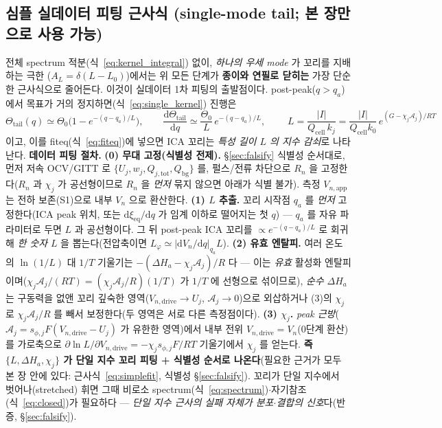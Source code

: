 \documentclass[11pt,a4paper]{article}
\newcommand{\dd}{\mathrm{d}}
\newcommand{\eq}{\mathrm{eq}}
\newcommand{\app}{\mathrm{app}}
\newcommand{\drive}{\mathrm{drive}}
\newcommand{\bg}{\mathrm{bg}}
\newcommand{\cell}{\mathrm{cell}}
\newcommand{\tot}{\mathrm{tot}}
\begin{document}
\subsection{심플 실데이터 피팅 근사식 (single-mode tail; 본 장만으로 사용 가능)}\label{sec:ch1_simplefit}
전체 spectrum 적분(식~\eqref{eq:kernel_integral}) 없이, \emph{하나의 우세 mode} 가 꼬리를 지배하는 극한
($A_L=\delta(L-L_0)$)에서는 위 모든 단계가 \textbf{종이와 연필로 닫히는} 가장 단순한 근사식으로 줄어든다. 이것이
실데이터 1차 피팅의 출발점이다. post-peak($q>q_a$) 에서 목표가 거의 정지하면(식~\eqref{eq:single_kernel}) 진행은
\begin{equation}
\Theta_\mathrm{tail}(q)\simeq\Theta_0\Big(1-e^{-(q-q_a)/L}\Big),\qquad
\frac{\dd\Theta_\mathrm{tail}}{\dd q}\simeq\frac{\Theta_0}{L}\,e^{-(q-q_a)/L},\qquad
\boxed{\;L=\frac{|I|}{Q_\cell\,k_j}=\frac{|I|}{Q_\cell k_0}\,e^{(G-\chi_j\mathcal A_j)/RT}\;}
\label{eq:simplefit}
\end{equation}
이고, 이를 fiteq(식~\eqref{eq:fiteq})에 넣으면 ICA 꼬리는 \emph{특성 길이 $L$ 의 지수 감쇠}로 나타난다.
\textbf{데이터 피팅 절차.}
\textbf{(0) 무대 고정(식별성 전제).} \S\ref{sec:falsify} 식별성 순서대로, 먼저 저속 OCV/GITT 로
$\{U_j,w_j,Q_{j,\tot},Q_\bg\}$ 를, 펄스/전류 차단으로 $R_n$ 을 고정한다($R_n$ 과 $\chi_j$ 가 공선형이므로 $R_n$ 을
\emph{먼저} 묶지 않으면 아래가 식별 불가). 측정 $V_{n,\app}$ 는 전하 보존(S1)으로 내부 $V_n$ 으로 환산한다.
\textbf{(1) $L$ 추출.} 꼬리 시작점 $q_a$ 를 \emph{먼저} 고정한다(ICA peak 위치, 또는 $\dd\xi_{\eq}/\dd q$ 가 임계
이하로 떨어지는 첫 $q$) — $q_a$ 를 자유 파라미터로 두면 $L$ 과 공선형이다. 그 뒤 post-peak ICA 꼬리를
$\propto e^{-(q-q_a)/L}$ 로 회귀해 \emph{한 숫자} $L$ 을 뽑는다(전압축이면 $L_\varphi\simeq|\dd V_n/\dd q|_{q_a}L$).
\textbf{(2) 유효 엔탈피.} 여러 온도의 $\ln(1/L)$ 대 $1/T$ 기울기는 $-(\Delta H_a-\chi_j\mathcal A_j)/R$ 다 — 이는
\emph{유효} 활성화 엔탈피이며($\chi_j\mathcal A_j/(RT)=(\chi_j\mathcal A_j/R)(1/T)$ 가 $1/T$ 에 선형으로 섞이므로),
\emph{순수} $\Delta H_a$ 는 구동력을 없앤 꼬리 깊숙한 영역($V_{n,\drive}\to U_j$, $\mathcal A_j\to0$)으로 외삽하거나
(3)의 $\chi_j$ 로 $\chi_j\mathcal A_j/R$ 를 빼서 보정한다(두 영역은 서로 다른 측정점이다).
\textbf{(3) $\chi_j$.} \emph{peak 근방}($\mathcal A_j=s_{\phi,j}F(V_{n,\drive}-U_j)$ 가 유한한 영역)에서 내부 전위
$V_{n,\drive}=V_n$(0단계 환산)를 가로축으로 $\partial\ln L/\partial V_{n,\drive}=-\chi_j s_{\phi,j}F/RT$ 기울기에서
$\chi_j$ 를 얻는다. \textbf{즉 $\{L,\Delta H_a,\chi_j\}$ 가 단일 지수 꼬리 피팅 + 식별성 순서로 나온다}(필요한
근거가 모두 본 장 안에 있다: 근사식~\eqref{eq:simplefit}, 식별성 \S\ref{sec:falsify}). 꼬리가 단일 지수에서
벗어나(stretched) 휘면 그때 비로소 spectrum(식~\eqref{eq:spectrum})$\cdot$자기참조(식~\eqref{eq:closed})가
필요하다 — \emph{단일 지수 근사의 실패 자체가 분포$\cdot$결합의 신호}다(반증, \S\ref{sec:falsify}).
\end{document}
